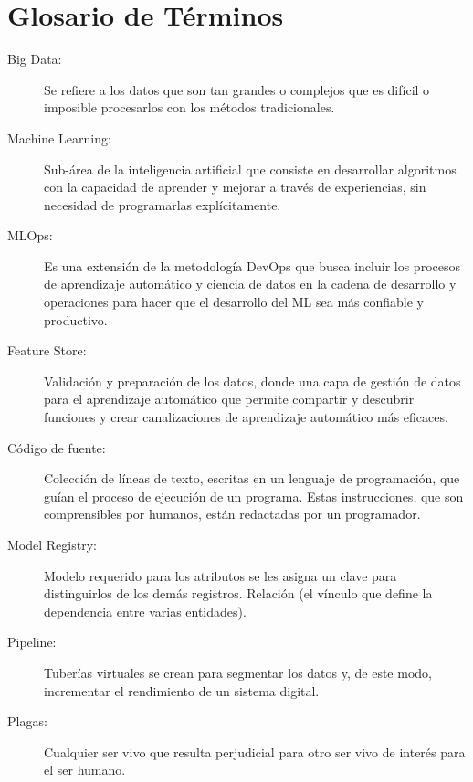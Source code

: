 \section{Glosario de Términos}

\begin{description}
\item[Big Data:] Se refiere a los datos que son tan grandes o complejos que es difícil o imposible procesarlos con los métodos tradicionales.
\item[Machine Learning:] Sub-área de la inteligencia artificial que consiste en desarrollar algoritmos con la capacidad de aprender y mejorar a través de experiencias, sin necesidad de programarlas explícitamente.
\item[MLOps:] Es una extensión de la metodología DevOps que busca incluir los procesos de aprendizaje automático y ciencia de datos en la cadena de desarrollo y operaciones para hacer que el desarrollo del ML sea más confiable y productivo.
\item[Feature Store:] Validación y preparación de los datos, donde una capa de gestión de datos para el aprendizaje automático que permite compartir y descubrir funciones y crear canalizaciones de aprendizaje automático más eficaces.
\item[Código de fuente:] Colección de líneas de texto, escritas en un lenguaje de programación, que guían el proceso de ejecución de un programa. Estas instrucciones, que son comprensibles por humanos, están redactadas por un programador.
\item[Model Registry:] Modelo requerido para los atributos se les asigna un clave para distinguirlos de los demás registros. Relación (el vínculo que define la dependencia entre varias entidades).
\item[Pipeline:] Tuberías virtuales se crean para segmentar los datos y, de este modo, incrementar el rendimiento de un sistema digital.
\item[Plagas:] Cualquier ser vivo que resulta perjudicial para otro ser vivo de interés para el ser humano.

\end{description}